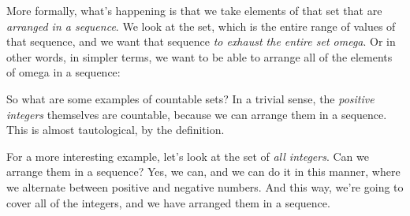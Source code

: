 \documentclass[pdftex, brazil, 12pt, twoside]{article}
\begin{document}
\begin{figure}[H]
  \begin{center}
  \end{center}
\end{figure}

More formally, what's happening is that we take
elements of that set that are \emph{arranged in a sequence}.
We look at the set, which is the entire range of values of
that sequence, and we want that sequence \emph{to exhaust the
entire set omega}.
Or in other words, in simpler terms, we want to be able to
arrange all of the elements of omega in a sequence:

\begin{figure}[H]
  \begin{center}
  \end{center}
\end{figure}

So what are some examples of countable sets?
In a trivial sense, the \emph{positive integers} themselves
are countable, because we can arrange them in a sequence.
This is almost tautological, by the definition.

For a more interesting example, let's look at the set
of \emph{all integers}.
Can we arrange them in a sequence?
Yes, we can, and we can do it in this manner, where we
alternate between positive and negative numbers.
And this way, we're going to cover all of the integers, and
we have arranged them in a sequence.

\begin{figure}[H]
  \begin{center}
  \end{center}
\end{figure}
\end{document}
